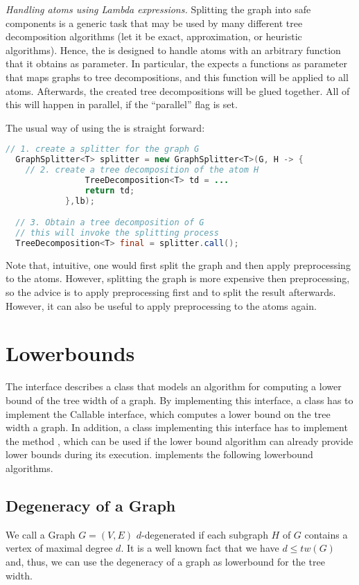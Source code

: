 \documentclass[a4paper, ukenglish, twoside, openright]{jdrasilmanual}
\begin{document}
\emph{Handling atoms using Lambda expressions.} Splitting the graph
into safe components is a generic task that may be used by many
different tree decomposition algorithms (let it be exact, approximation,
or heuristic algorithms). Hence, the  is
designed to handle atoms with an arbitrary function that it obtains as
parameter. In particular, the  expects a
functions as parameter that maps graphs to tree decompositions, and
this function will be applied to all atoms. Afterwards, the created
tree decompositions will be glued together. All of this will happen in
parallel, if the ``parallel'' flag is set.

The usual way of using the  is straight forward:
\begin{lstlisting}[language=Java]
  // 1. create a splitter for the graph G
  GraphSplitter<T> splitter = new GraphSplitter<T>(G, H -> {
    // 2. create a tree decomposition of the atom H
                TreeDecomposition<T> td = ...
                return td;
            },lb);

  // 3. Obtain a tree decomposition of G
  // this will invoke the splitting process
  TreeDecomposition<T> final = splitter.call();
\end{lstlisting}
Note that, intuitive, one would first split the graph and then apply
preprocessing to the atoms. However, splitting the graph is more
expensive then preprocessing, so the advice is to apply preprocessing
first and to split the result afterwards. However, it can also be
useful to apply preprocessing to the atoms again.

\chapter{Lowerbounds}
The  interface describes a class that models an
algorithm for computing a lower bound of the tree width of a graph.
By implementing this interface, a class has to implement the Callable
interface, which computes a lower bound on the tree width 
a graph. In addition, a class implementing this interface has to
implement the method , which can be used
if the lower bound algorithm can already provide lower bounds during
its execution. \Jdrasil{} implements the following lowerbound algorithms.

\section{Degeneracy of a Graph}
We call a Graph $G=(V,E)$ $d$-degenerated if each subgraph $H$ of $G$ contains
a vertex of maximal degree $d$.  It is a well known fact that we have
\(d \le tw(G)\) and, thus, we can use the degeneracy of a graph as
lowerbound for the tree width.
\end{document}
